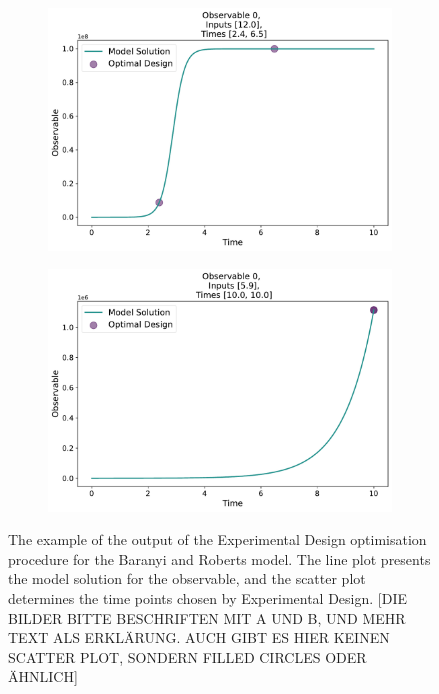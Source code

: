 \documentclass[10pt,A4paper]{article}
\begin{document}
\begin{figure}[H]
    \begin{subfigure}{.9\textwidth}
        \centering
        \includegraphics[scale=0.35]{Figures/Observable_Results_baranyi_roberts_ode_fisher_determinant_rel_sensit_cont_2times_2temps_000_x_00.pdf}
      \end{subfigure}    
      \begin{subfigure}{.9\textwidth}
        \centering
        \includegraphics[scale=0.35]{Figures/Observable_Results_baranyi_roberts_ode_fisher_determinant_rel_sensit_cont_2times_2temps_001_x_00.pdf}
      \end{subfigure}
    \caption{{\footnotesize The example of the output of the Experimental Design optimisation procedure for the Baranyi and Roberts model. 
    The line plot presents the model solution for the observable, and the scatter plot determines the time points chosen by Experimental Design. [DIE BILDER BITTE BESCHRIFTEN MIT A UND B, UND MEHR TEXT ALS ERKLÄRUNG. AUCH GIBT ES HIER KEINEN SCATTER PLOT, SONDERN FILLED CIRCLES ODER ÄHNLICH]}}
    \label{fig:baranyi_roberts_observable}
\end{figure}
\end{document}
